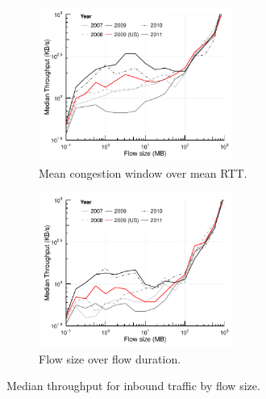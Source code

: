 \begin{figure}
    \begin{subfigure}[b]{.5\linewidth}
        \centering
        \includegraphics[width=2.5in]{figures/malawi/med_active_throughput}
        \caption{Mean congestion window over mean \ac{RTT}. \label{fig:flowrateactive}}
    \end{subfigure}%
    \begin{subfigure}[b]{.5\linewidth}
        \centering
        \includegraphics[width=2.5in]{figures/malawi/med_aggr_throughput}
        \caption{Flow size over flow duration.\label{fig:flowrateaggr}}
    \end{subfigure}%
    \caption{Median throughput for inbound traffic by flow size. \label{fig:flowrate}}
\end{figure}
 
